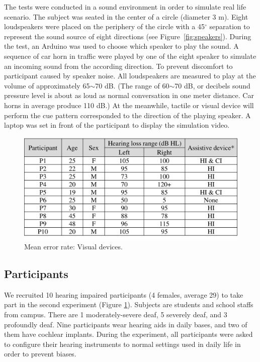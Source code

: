 \documentclass{sigchi}
\begin{document}
The tests were conducted in a sound environment in order to simulate real life scenario. The subject was seated in the center of a circle (diameter 3 m). Eight loudspeakers were placed on the periphery of the circle with a 45$^\circ$ separation to represent the sound source of eight directions (see Figure~\ref{fig:speakers}). During the test, an Arduino was used to choose which speaker to play the sound. A sequence of car horn in traffic were played by one of the eight speaker to simulate an incoming sound from the according direction. To prevent discomfort to participant caused by speaker noise. All loudspeakers are measured to play at the volume of approximately 65$\sim$70 dB. (The range of 60$\sim$70 dB, or decibels sound pressure level is about as loud as normal conversation in one meter distance. Car horns in average produce 110 dB.) At the meanwhile, tactile or visual device will perform the cue pattern corresponded to the direction of the playing speaker. A laptop was set in front of the participant to display the simulation video.

\begin{figure}[!h]
\centering
\includegraphics[width=\columnwidth]{participants}
\caption{Mean error rate: Visual devices.}
\label{fig:participants}
\end{figure}

\subsection{Participants}
We recruited 10 hearing impaired participants (4 females, average 29) to take part in the second experiment (Figure \ref{fig:participants}). Subjects are students and school staffs from campus. There are 1 moderately-severe deaf, 5 severely deaf, and 3 profoundly deaf. Nine participants wear hearing aids in daily bases, and two of them have cochlear implants. During the experiment, all participants were asked to configure their hearing instruments to normal settings used in daily life in order to prevent biases.
\end{document}
